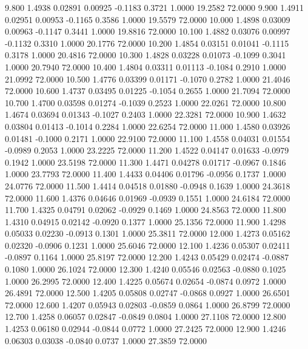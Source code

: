    9.800   1.4938   0.02891   0.00925  -0.1183   0.3721   1.0000  19.2582  72.0000
   9.900   1.4911   0.02951   0.00953  -0.1165   0.3586   1.0000  19.5579  72.0000
  10.000   1.4898   0.03009   0.00963  -0.1147   0.3441   1.0000  19.8816  72.0000
  10.100   1.4882   0.03076   0.00997  -0.1132   0.3310   1.0000  20.1776  72.0000
  10.200   1.4854   0.03151   0.01041  -0.1115   0.3178   1.0000  20.4816  72.0000
  10.300   1.4828   0.03228   0.01073  -0.1099   0.3041   1.0000  20.7940  72.0000
  10.400   1.4804   0.03311   0.01113  -0.1084   0.2910   1.0000  21.0992  72.0000
  10.500   1.4776   0.03399   0.01171  -0.1070   0.2782   1.0000  21.4046  72.0000
  10.600   1.4737   0.03495   0.01225  -0.1054   0.2655   1.0000  21.7094  72.0000
  10.700   1.4700   0.03598   0.01274  -0.1039   0.2523   1.0000  22.0261  72.0000
  10.800   1.4674   0.03694   0.01343  -0.1027   0.2403   1.0000  22.3281  72.0000
  10.900   1.4632   0.03804   0.01413  -0.1014   0.2284   1.0000  22.6254  72.0000
  11.000   1.4580   0.03926   0.01481  -0.1000   0.2171   1.0000  22.9100  72.0000
  11.100   1.4558   0.04031   0.01554  -0.0989   0.2053   1.0000  23.2225  72.0000
  11.200   1.4522   0.04147   0.01633  -0.0979   0.1942   1.0000  23.5198  72.0000
  11.300   1.4471   0.04278   0.01717  -0.0967   0.1846   1.0000  23.7793  72.0000
  11.400   1.4433   0.04406   0.01796  -0.0956   0.1737   1.0000  24.0776  72.0000
  11.500   1.4414   0.04518   0.01880  -0.0948   0.1639   1.0000  24.3618  72.0000
  11.600   1.4376   0.04646   0.01969  -0.0939   0.1551   1.0000  24.6184  72.0000
  11.700   1.4325   0.04791   0.02062  -0.0929   0.1469   1.0000  24.8563  72.0000
  11.800   1.4310   0.04915   0.02142  -0.0920   0.1377   1.0000  25.1356  72.0000
  11.900   1.4298   0.05033   0.02230  -0.0913   0.1301   1.0000  25.3811  72.0000
  12.000   1.4273   0.05162   0.02320  -0.0906   0.1231   1.0000  25.6046  72.0000
  12.100   1.4236   0.05307   0.02411  -0.0897   0.1164   1.0000  25.8197  72.0000
  12.200   1.4243   0.05429   0.02474  -0.0887   0.1080   1.0000  26.1024  72.0000
  12.300   1.4240   0.05546   0.02563  -0.0880   0.1025   1.0000  26.2995  72.0000
  12.400   1.4225   0.05674   0.02654  -0.0874   0.0972   1.0000  26.4891  72.0000
  12.500   1.4205   0.05808   0.02747  -0.0868   0.0927   1.0000  26.6501  72.0000
  12.600   1.4207   0.05943   0.02803  -0.0859   0.0864   1.0000  26.8799  72.0000
  12.700   1.4258   0.06057   0.02847  -0.0849   0.0804   1.0000  27.1108  72.0000
  12.800   1.4253   0.06180   0.02944  -0.0844   0.0772   1.0000  27.2425  72.0000
  12.900   1.4246   0.06303   0.03038  -0.0840   0.0737   1.0000  27.3859  72.0000
